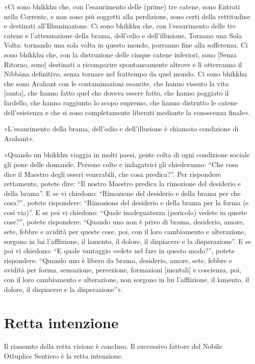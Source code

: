 «Ci sono bhikkhu che, con l’esaurimento delle (prime) tre catene, sono
Entrati nella Corrente, e non sono più soggetti alla perdizione, sono
certi della rettitudine e destinati all’Illuminazione. Ci sono bhikkhu
che, con l’esaurimento delle tre catene e l’attenuazione della brama,
dell’odio e dell’illusione, Tornano una Sola Volta: tornando una sola
volta in questo mondo, porranno fine alla sofferenza. \label{pag263}Ci sono bhikkhu
che, con la distruzione delle cinque catene inferiori, sono [Senza
Ritorno, sono] destinati a ricomparire spontaneamente altrove e lì
otterranno il Nibbāna definitivo, senza tornare nel frattempo da quel
mondo. Ci sono bhikkhu che sono Arahant con le contaminazioni esaurite,
che hanno vissuto la vita [santa], che hanno fatto quel che doveva
essere fatto, che hanno poggiato il fardello, che hanno raggiunto lo
scopo supremo, che hanno distrutto le catene dell’esistenza e che si
sono completamente liberati mediante la conoscenza finale».




«L’esaurimento della brama, dell’odio e dell’illusione è chiamato
condizione di Arahant».




«Quando un bhikkhu viaggia in molti paesi, gente colta di ogni
condizione sociale gli pone delle domande. Persone colte e indagatrici
gli chiederanno: “Che cosa dice il Maestro degli esseri venerabili, che
cosa predica?”. Per rispondere rettamente, potete dire: “Il nostro
Maestro predica la rimozione del desiderio e della brama”. E se vi
chiedono: “Rimozione del desiderio e della brama per che cosa?”, potete
rispondere: “Rimozione del desiderio e della brama per la forma (e così
via)”. E se poi vi chiedono: “Quale inadeguatezza (pericolo) vedete in
queste cose?”, potete rispondere: “Quando uno non è privo di brama,
desiderio, amore, sete, febbre e avidità per queste cose, poi, con il
loro cambiamento e alterazione, sorgono in lui l’afflizione, il lamento,
il dolore, il dispiacere e la disperazione”. E se poi vi chiedono: “E
quale vantaggio vedete nel fare in questo modo?”, potete rispondere:
“Quando uno è libero da brama, desiderio, amore, sete, febbre e avidità
per forma, sensazione, percezione, formazioni [mentali] e coscienza,
poi, con il loro cambiamento e alterazione, non sorgono in lui
l’afflizione, il lamento, il dolore, il dispiacere e la disperazione”».




\hypertarget{x-retta-intenzione}{\section*{Retta intenzione}}
 Il riassunto della retta visione è concluso. Il
successivo fattore del Nobile Ottuplice Sentiero è la retta intenzione.


